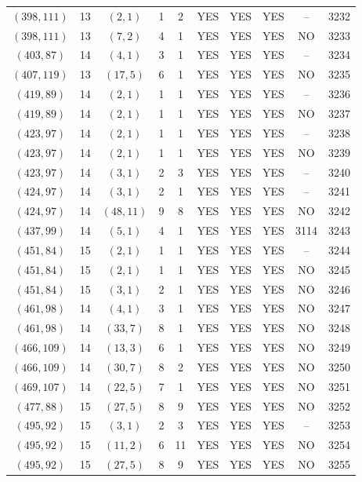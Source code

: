 \begin{longtable}{|c|c|c|c|c|c|c|c|c|c|}
$(398, 111)$ & 13 & $(2, 1)$ & 1 & 2 & YES & YES & YES & -- & 3232\\
$(398, 111)$ & 13 & $(7, 2)$ & 4 & 1 & YES & YES & YES & NO & 3233\\
$(403, 87)$ & 14 & $(4, 1)$ & 3 & 1 & YES & YES & YES & -- & 3234\\
$(407, 119)$ & 13 & $(17, 5)$ & 6 & 1 & YES & YES & YES & NO & 3235\\
$(419, 89)$ & 14 & $(2, 1)$ & 1 & 1 & YES & YES & YES & -- & 3236\\
$(419, 89)$ & 14 & $(2, 1)$ & 1 & 1 & YES & YES & YES & NO & 3237\\
$(423, 97)$ & 14 & $(2, 1)$ & 1 & 1 & YES & YES & YES & -- & 3238\\
$(423, 97)$ & 14 & $(2, 1)$ & 1 & 1 & YES & YES & YES & NO & 3239\\
$(423, 97)$ & 14 & $(3, 1)$ & 2 & 3 & YES & YES & YES & -- & 3240\\
$(424, 97)$ & 14 & $(3, 1)$ & 2 & 1 & YES & YES & YES & -- & 3241\\
$(424, 97)$ & 14 & $(48, 11)$ & 9 & 8 & YES & YES & YES & NO & 3242\\
$(437, 99)$ & 14 & $(5, 1)$ & 4 & 1 & YES & YES & YES & 3114 & 3243\\
$(451, 84)$ & 15 & $(2, 1)$ & 1 & 1 & YES & YES & YES & -- & 3244\\
$(451, 84)$ & 15 & $(2, 1)$ & 1 & 1 & YES & YES & YES & NO & 3245\\
$(451, 84)$ & 15 & $(3, 1)$ & 2 & 1 & YES & YES & YES & NO & 3246\\
$(461, 98)$ & 14 & $(4, 1)$ & 3 & 1 & YES & YES & YES & NO & 3247\\
$(461, 98)$ & 14 & $(33, 7)$ & 8 & 1 & YES & YES & YES & NO & 3248\\
$(466, 109)$ & 14 & $(13, 3)$ & 6 & 1 & YES & YES & YES & NO & 3249\\
$(466, 109)$ & 14 & $(30, 7)$ & 8 & 2 & YES & YES & YES & NO & 3250\\
$(469, 107)$ & 14 & $(22, 5)$ & 7 & 1 & YES & YES & YES & NO & 3251\\
$(477, 88)$ & 15 & $(27, 5)$ & 8 & 9 & YES & YES & YES & NO & 3252\\
$(495, 92)$ & 15 & $(3, 1)$ & 2 & 3 & YES & YES & YES & -- & 3253\\
$(495, 92)$ & 15 & $(11, 2)$ & 6 & 11 & YES & YES & YES & NO & 3254\\
$(495, 92)$ & 15 & $(27, 5)$ & 8 & 9 & YES & YES & YES & NO & 3255\\

\end{longtable}

